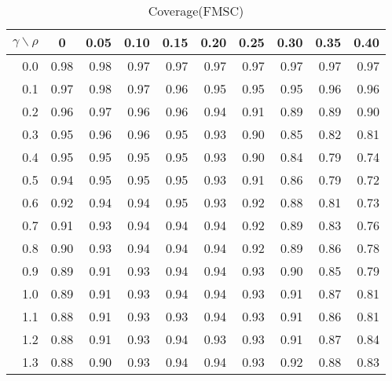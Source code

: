 \documentclass[12pt]{article}
\begin{document}
%
\begin{table}[!tbp]
\caption{Coverage(FMSC)}
 \begin{center}
 \begin{tabular}{r|rrrrrrrrr}\hline\hline
\multicolumn{1}{c|}{$\gamma\backslash\rho$}&\multicolumn{1}{c}{0}&\multicolumn{1}{c}{0.05}&\multicolumn{1}{c}{0.10}&\multicolumn{1}{c}{0.15}&\multicolumn{1}{c}{0.20}&\multicolumn{1}{c}{0.25}&\multicolumn{1}{c}{0.30}&\multicolumn{1}{c}{0.35}&\multicolumn{1}{c}{0.40}\tabularnewline
\hline

0.0&0.98&0.98&0.97&0.97&0.97&0.97&0.97&0.97&0.97\tabularnewline
0.1&0.97&0.98&0.97&0.96&0.95&0.95&0.95&0.96&0.96\tabularnewline
0.2&0.96&0.97&0.96&0.96&0.94&0.91&0.89&0.89&0.90\tabularnewline
0.3&0.95&0.96&0.96&0.95&0.93&0.90&0.85&0.82&0.81\tabularnewline
0.4&0.95&0.95&0.95&0.95&0.93&0.90&0.84&0.79&0.74\tabularnewline
0.5&0.94&0.95&0.95&0.95&0.93&0.91&0.86&0.79&0.72\tabularnewline
0.6&0.92&0.94&0.94&0.95&0.93&0.92&0.88&0.81&0.73\tabularnewline
0.7&0.91&0.93&0.94&0.94&0.94&0.92&0.89&0.83&0.76\tabularnewline
0.8&0.90&0.93&0.94&0.94&0.94&0.92&0.89&0.86&0.78\tabularnewline
0.9&0.89&0.91&0.93&0.94&0.94&0.93&0.90&0.85&0.79\tabularnewline
1.0&0.89&0.91&0.93&0.94&0.94&0.93&0.91&0.87&0.81\tabularnewline
1.1&0.88&0.91&0.93&0.93&0.94&0.93&0.91&0.86&0.81\tabularnewline
1.2&0.88&0.91&0.93&0.94&0.93&0.93&0.91&0.87&0.84\tabularnewline
1.3&0.88&0.90&0.93&0.94&0.94&0.93&0.92&0.88&0.83\tabularnewline
\hline
\end{tabular}

\end{center}

\end{table}
\end{document}
